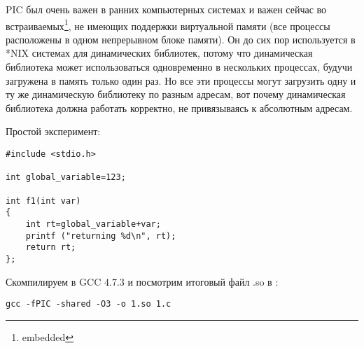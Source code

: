 \ac{PIC} был очень важен в ранних компьютерных системах и важен сейчас во встраиваемых\footnote{embedded}, не имеющих поддержки виртуальной памяти (все процессы расположены в одном непрерывном блоке памяти).
Он до сих пор используется в *NIX системах для динамических библиотек, потому что динамическая библиотека может использоваться одновременно в нескольких процессах, будучи загружена в память только один раз.
Но все эти процессы могут загрузить одну и ту же динамическую библиотеку по разным адресам, вот почему динамическая библиотека должна работать корректно, не привязываясь к абсолютным адресам.

Простой эксперимент:

\begin{lstlisting}[style=customc]
#include <stdio.h>

int global_variable=123;

int f1(int var)
{
    int rt=global_variable+var;
    printf ("returning %d\n", rt);
    return rt;
};
\end{lstlisting}

Скомпилируем в GCC 4.7.3 и посмотрим итоговый файл .so в \IDA:

\begin{lstlisting}
gcc -fPIC -shared -O3 -o 1.so 1.c
\end{lstlisting}

